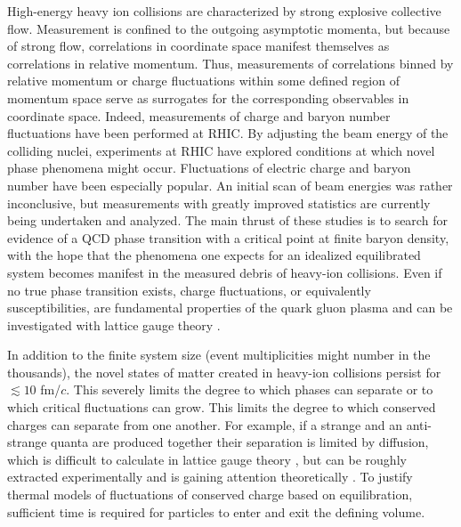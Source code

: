 High-energy heavy ion collisions are characterized by strong explosive collective flow. Measurement is confined to the outgoing asymptotic momenta, but because of strong flow, correlations in coordinate space manifest themselves as correlations in relative momentum. Thus, measurements of correlations binned by relative momentum or charge fluctuations within some defined region of momentum space serve as surrogates for the corresponding observables in coordinate space. Indeed, measurements of charge and baryon number fluctuations have been performed at RHIC. By adjusting the beam energy of the colliding nuclei, experiments at RHIC have explored conditions at which novel phase phenomena might occur. Fluctuations of electric charge and baryon number have been especially popular. An initial scan of beam energies \cite{Abelev:2008jg,Sarkar:2014fja,Xu:2016hxf,Thader:2016gpa,Luo:2012kja,Tarnowsky:2011vk,Aggarwal:2010wy,Chatterjee:2019msq,Adam:2019xmk,Adamczyk:2014fia,Sarkar:2013qla,Luo:2013saa,Sahoo:2012pfx,Luo:2011ts,Sahoo:2011at,R.Sahoo:2011qtk,Nayak:2009wc,McDonald:2012ts,McDonald:2013aoa,Adam:2020unf,Adamczyk:2017wsl} was rather inconclusive, but measurements with greatly improved statistics are currently being undertaken and analyzed. The main thrust of these studies is to search for evidence of a QCD phase transition with a critical point at finite baryon density, with the hope that the phenomena one expects for an idealized equilibrated system \cite{Stephanov:1998dy,Stephanov:1999zu} becomes manifest in the measured debris of heavy-ion collisions. Even if no true phase transition exists, charge fluctuations, or equivalently susceptibilities, are fundamental properties of the quark gluon plasma and can be investigated with lattice gauge theory \cite{Borsanyi:2011sw}.

In addition to the finite system size (event multiplicities might number in the thousands), the novel states of matter created in heavy-ion collisions persist for $\lesssim 10$ fm/$c$. This severely limits the degree to which phases can separate or to which critical fluctuations can grow. This limits the degree to which conserved charges can separate from one another. For example, if a strange and an anti-strange quanta are produced together their separation is limited by diffusion, which is difficult to calculate in lattice gauge theory \cite{Aarts:2014nba,Amato:2013naa}, but can be roughly extracted experimentally and is gaining attention theoretically \cite{Aziz:2004qu,Kapusta:2014dja,Kapusta:2017hfi,Hammelmann:2018ath}. To justify thermal models of fluctuations of conserved charge based on equilibration, sufficient time is required for particles to enter and exit the defining volume.

